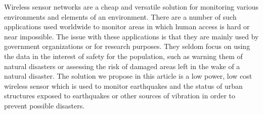  Wireless sensor networks are a cheap and versatile solution for monitoring various environments 
and elements of an environment. There are a number of such applications used worldwide to monitor 
areas in which human access is hard or near impossible. The issue with these applications is that 
they are mainly used by government organizations or for research purposes. They seldom focus on 
using the data in the interest of safety for the population, such as warning them of natural 
disasters or assessing the risk of damaged areas left in the wake of a natural disaster. The 
solution we propose in this article is a low power, low cost wireless sensor which is used to 
monitor earthquakes and the status of urban structures exposed to earthquakes or other sources 
of vibration in order to prevent possible disasters.
